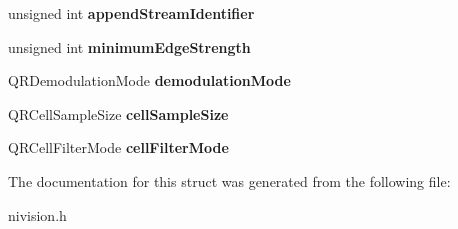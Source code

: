 \begin{DoxyCompactItemize}
\item 
\hypertarget{structQRCodeReport__struct_a771f4331b91e11ec2e8523d869969726}{
unsigned int {\bfseries appendStreamIdentifier}}
\label{structQRCodeReport__struct_a771f4331b91e11ec2e8523d869969726}

\item 
\hypertarget{structQRCodeReport__struct_adddbb26d772d60cd938b5eba1766b919}{
unsigned int {\bfseries minimumEdgeStrength}}
\label{structQRCodeReport__struct_adddbb26d772d60cd938b5eba1766b919}

\item 
\hypertarget{structQRCodeReport__struct_ade39813e37228ee419f1a9446e01ff43}{
QRDemodulationMode {\bfseries demodulationMode}}
\label{structQRCodeReport__struct_ade39813e37228ee419f1a9446e01ff43}

\item 
\hypertarget{structQRCodeReport__struct_a5d4f1639543c9d2eca5d3c4bfddc1ee6}{
QRCellSampleSize {\bfseries cellSampleSize}}
\label{structQRCodeReport__struct_a5d4f1639543c9d2eca5d3c4bfddc1ee6}

\item 
\hypertarget{structQRCodeReport__struct_a9b4111d1c50ec4f962dcc6e91f79a44e}{
QRCellFilterMode {\bfseries cellFilterMode}}
\label{structQRCodeReport__struct_a9b4111d1c50ec4f962dcc6e91f79a44e}

\end{DoxyCompactItemize}


The documentation for this struct was generated from the following file:\begin{DoxyCompactItemize}
\item 
nivision.h\end{DoxyCompactItemize}
